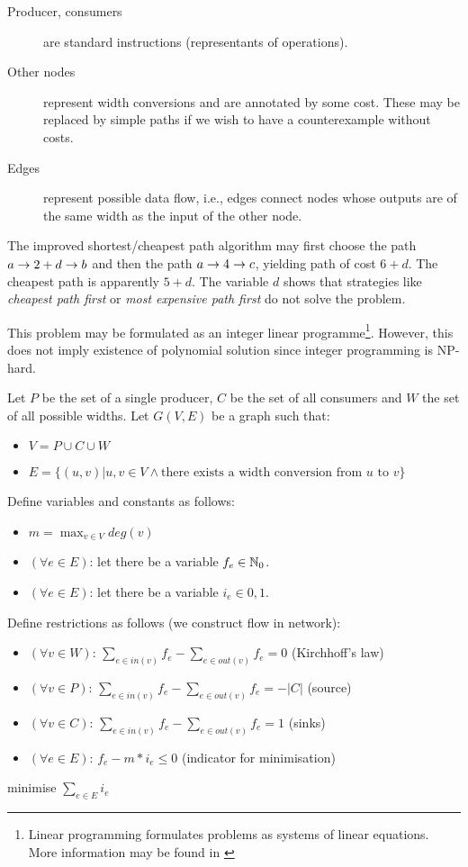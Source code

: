 \begin{description}
  \item[Producer, consumers] are standard instructions (representants of operations).
  \item[Other nodes] represent width conversions and are annotated by some cost. These may be replaced by simple paths if we wish to have a counterexample without costs.
  \item[Edges] represent possible data flow, i.e., edges connect nodes whose outputs are of the same width as the input of the other node.
  \end{description}

The improved shortest/cheapest path algorithm may first choose the path $ a \rightarrow 2 + d \rightarrow b $ and then the path $ a \rightarrow 4 \rightarrow c $, yielding path of cost $6+d$. The cheapest path is apparently $5+d$. The variable $d$ shows that strategies like \emph{cheapest path first} or \emph{most expensive path first} do not solve the problem.

This problem may be formulated as an integer linear programme\footnote{Linear programming formulates problems as systems of linear equations. More information may be found in \cite{TODO}}. However, this does not imply existence of polynomial solution since integer programming is NP-hard. 

Let $P$ be the set of a single producer, $C$ be the set of all consumers and $W$ the set of all possible widths. Let $G(V,E)$ be a graph such that:
\begin{itemize}
  \item $V = P \cup C \cup W$
  \item $E = \{ (u,v) | u,v \in V \land \text{there exists a width conversion from } u \text{ to } v \}$
\end{itemize}
Define variables and constants as follows:
\begin{itemize}
\item $m = \max_{v \in V}deg(v)$
\item $(\forall e \in E)$: let there be a variable $f_e \in \mathbb{N}_0$.
\item $(\forall e \in E)$: let there be a variable $i_e \in {0,1}$.
\end{itemize}
Define restrictions as follows (we construct flow in network):
\begin{itemize}
\item $(\forall v \in W)$: $\sum_{e \in in(v)} f_e - \sum_{e\in out(v)} f_e = 0$ (Kirchhoff's law)
\item $(\forall v \in P)$: $\sum_{e \in in(v)} f_e - \sum_{e\in out(v)} f_e = - | C |$ (source)
\item $(\forall v \in C)$: $\sum_{e \in in(v)} f_e - \sum_{e\in out(v)} f_e = 1$ (sinks)
\item $(\forall e \in E)$: $f_e - m*i_e \leq 0$ (indicator for minimisation)
\end{itemize}
minimise $\sum_{e \in E} i_e$

